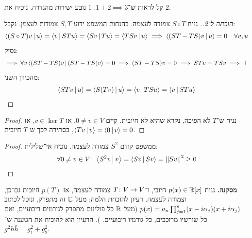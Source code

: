 \documentclass[]{../../../../tex/classes/styledArticle}
\begin{document}
קל לראות ש־$1 + 2 \implies 3$. $1$ נובע ישירות מהגדרה. נוכיח את $2$. \begin{proof}[הוכחה ל־2.]
    נניח $S \circ T$ צמודה לעצמה. בהנחות המשפט ידוע $S, T$ צמודות לעצמן. נקבל: 
        \[ \left \langle (S \circ T)v \,\middle|\, u \right \rangle = \left \langle v \,\middle|\, STu \right \rangle = \left \langle Sv \,\middle|\, Tu \right \rangle = \left \langle TSv \,\middle|\, u \right \rangle \implies \left \langle (ST - TS)v \,\middle|\, u \right \rangle = 0 \quad \forall v, u \]
        נסיק: 
        \[ \implies \forall v\left \langle (ST - TS)v \,\middle|\, (ST - TS)v \right \rangle = 0  \implies (ST - TS)v = 0 \implies STv = TSv \implies \top \]
        מהכיוון השני: 
        \[ \left \langle STv \,\middle|\, u \right \rangle = \left \langle S(Tv) \,\middle|\, u \right \rangle = \left \langle v \,\middle|\, TSu \right \rangle = \left \langle v \,\middle|\, STu \right \rangle \]
    \end{proof}
     \begin{proof}
        נניח ש־$T$ לא הפיכה, נקרא שהיא לא חיובית. קיים $0 \neq v \in V$. אז $v \in \ker T$, אז $\left \langle Tv \,\middle|\, v \right \rangle = \left \langle 0 \,\middle|\, v \right \rangle = 0$, בסתירה לכך ש־$T$ חיובית. 
    \end{proof}
    \begin{proof}
        ממשפט קודם $S^{2}$ צמודה לעצמה. נוכיח אי־שלילית: 
        \[ \forall 0 \neq v \in V \colon \left \langle S^{2}v \,\middle|\, v \right \rangle = \left \langle Sv \,\middle|\, Sv \right \rangle = \left \vert \left \vert Sv \right \vert \right \vert^{2} \ge 0 \]
    \end{proof}
    \textbf{מסקנה. }נניח $p(x) \in \mathbb{R}[x]$ חיובי, ו־$T \colon V \to V$ צמודה לעצמה, אז $p(T)$ חיובית גם־כן, וצמודה לעצמה. 
    רעיון להוכחת הלמה: מעל $\mathbb{C}$ זה מתפרק, ונוכל לכתוב $p(x) = a_n\prod_{j = 1}^{s} (x - i\alpha_j)(x + i\alpha_j)$ (מעל $\mathbb{R}$ כל פולינום מתפרק לגורמים ריבועיים, ואם כל שורשיו מרוכבים, כל גורמיו ריבועיים. ). הרעיון הוא להוכיח את הטענה ש־$g^2 h \bar h = g_1^2 + g_2^2$.
\end{document}

